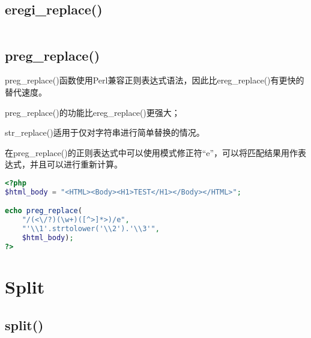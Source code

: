 \begin{lstlisting}[language=PHP]

\end{lstlisting}


\section{eregi\_replace()}





\begin{lstlisting}[language=PHP]

\end{lstlisting}


\section{preg\_replace()}

preg\_replace()函数使用Perl兼容正则表达式语法，因此比ereg\_replace()有更快的替代速度。

\begin{compactitem}
\item preg\_replace()的功能比ereg\_replace()更强大；
\item str\_replace()适用于仅对字符串进行简单替换的情况。
\end{compactitem}

在preg\_replace()的正则表达式中可以使用模式修正符“e”，可以将匹配结果用作表达式，并且可以进行重新计算。


\begin{lstlisting}[language=PHP]
<?php
$html_body = "<HTML><Body><H1>TEST</H1></Body></HTML>";

echo preg_replace(
	"/(<\/?)(\w+)([^>]*>)/e",
	"'\\1'.strtolower('\\2').'\\3'",
	$html_body);
?>
\end{lstlisting}

\chapter{Split}

\section{split()}






\begin{lstlisting}[language=PHP]

\end{lstlisting}



